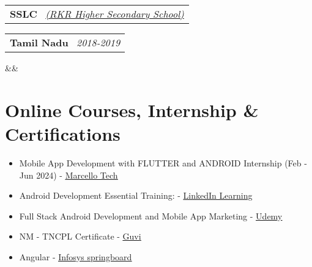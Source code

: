 \documentclass[11pt,a4paper,sans]{moderncv}
\makeatletter
\newcommand*{\customcventry}[7][.13em]{
\begin{tabular}{@{}l}
{\bfseries #4} \
{\itshape #3}
\end{tabular}
\hfill
\begin{tabular}{l@{}}
{\bfseries #5} \
{\itshape #2}
\end{tabular}
\ifx&#7&%
\else{\
\begin{minipage}{\maincolumnwidth}%
\small#7%
\end{minipage}}\fi%
\par\addvspace{#1}}
\makeatother
\begin{document}
\customcventry{2018-2019}{\color{blue}\href{https://maps.app.goo.gl/swjMz2NegtAx1KPa7}{(RKR Higher Secondary School)}}{SSLC}{Tamil Nadu}{}{}{Percentage - 66.4\%}




\section{Online Courses, Internship \& Certifications}
{\begin{itemize}[label=\textbullet]
    \item Mobile App Development with FLUTTER and ANDROID Internship (Feb - Jun 2024) - \underline{\color{blue}\href{https://drive.google.com/file/d/106r6WD5MoSY4W-4qcN8Q6bOjGdFwLJle/view?usp=sharing}{Marcello Tech}}
      \item Android Development Essential Training:  - \underline{\color{blue}\href{https://www.linkedin.com/learning/certificates/3d84c3c470dff3dbd09221f12004410fbdb972d52898465a478ffb237e45b191}{LinkedIn Learning }}
      \item Full Stack Android Development and Mobile App Marketing - \underline{\color{blue}\href{https://www.udemy.com/certificate/UC-9390eed1-94c8-4a98-a2d1-ccac9d444f3b/}{Udemy}}
      \item NM - TNCPL Certificate - \underline{\color{blue}\href{https://drive.google.com/file/d/1dBxFOHJ8DFHbNkEPyetAinCPjiz-FSus/view?usp=sharing}{Guvi}}
      \item Angular - \underline{\color{blue}\href{https://drive.google.com/file/d/1Bws5M4kNewjU-QVsx7zVGm3iZ2hZC0Ea/view?usp=sharing}{Infosys springboard}}
     
  \end{itemize}} 





\end{document}
